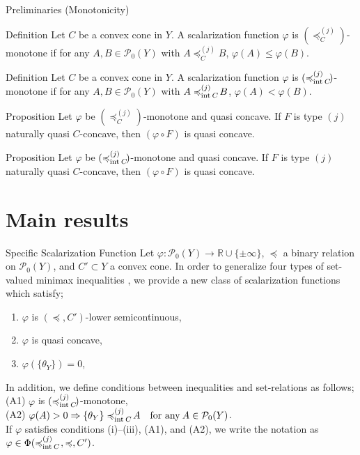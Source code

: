 \documentclass[aspectratio=169, dvipdfmx, 11pt]{beamer}
\newcommand{\RealNumberSet}{\mathbb{R}}
\newcommand{\Interior}[1]{\text{\rm int\:${#1}$}} %
\newcommand{\pow}[1]{\mathcal{P}_{0}(#1)}
\newcommand{\setrel}[2]{\preccurlyeq^{(#1)}_{#2}\!}
\begin{document}
\begin{frame}{Preliminaries (Monotonicity)}
  \begin{block}{Definition}
    Let $C$ be a convex cone in $Y$.
    A scalarization function $\varphi$ is $(\setrel{j}{C})$-monotone if
    for any $A, B \in \pow{Y}$ with
    $A \setrel{j}{C} B$, $\varphi (A) \leq \varphi (B)$.
  \end{block}

  \begin{block}{Definition}
    Let $C$ be a convex cone in $Y$.
    A scalarization function $\varphi$ is $(\setrel{j}{\Interior{C}})$-monotone if
    for any $A, B \in \pow{Y}$ with
    $A \setrel{j}{\Interior{C}} B$, $\varphi (A) < \varphi (B)$.
  \end{block}

  \begin{block}{Proposition}
    Let $\varphi$ be $(\setrel{j}{C})$-monotone and quasi concave.
    If $F$ is type $(j)$ naturally quasi $C$-concave,
    then $(\varphi \circ F)$ is quasi concave.
  \end{block}

  \begin{block}{Proposition}
    Let $\varphi$ be $(\setrel{j}{\Interior{C}})$-monotone and quasi concave.
    If $F$ is type $(j)$ naturally quasi $C$-concave,
    then $(\varphi \circ F)$ is quasi concave.
  \end{block}
\end{frame}

\section{Main results}

\begin{frame}{Specific Scalarization Function}
  Let $\varphi: \pow{Y} \to \RealNumberSet \cup \{\pm \infty\}$, $\preccurlyeq$ a binary relation
  on $\pow{Y}$, and $C' \subset Y$  a convex cone.
  In order to generalize four types of set-valued minimax inequalities \cite{MR2778674},
  we provide a new class of scalarization functions which satisfy;
  \begin{enumerate}
    \item $\varphi$ is $(\preccurlyeq, C')$-lower semicontinuous,
    \item $\varphi$ is quasi concave,
    \item $\varphi(\{\theta_{Y}\}) = 0$,
  \end{enumerate}
  In addition, we define conditions between inequalities and set-relations as follows;\\
  \vspace{2mm}
  (A1) $\varphi$ is $(\setrel{j}{\Interior{C}})$-monotone,\\
  (A2) $\varphi (A) > 0 \Rightarrow  \{\theta_Y\} \setrel{j}{\Interior{C}} A \quad\text{for any}\:A \in \pow{Y}$.\\
  \vspace{2mm}
  If $\varphi$ satisfies conditions (i)--(iii), (A1), and (A2),
  we write the notation as $\varphi \in \Phi(\setrel{j}{\Interior{C}}\:, \preccurlyeq, C')$.
\end{frame}
\end{document}
